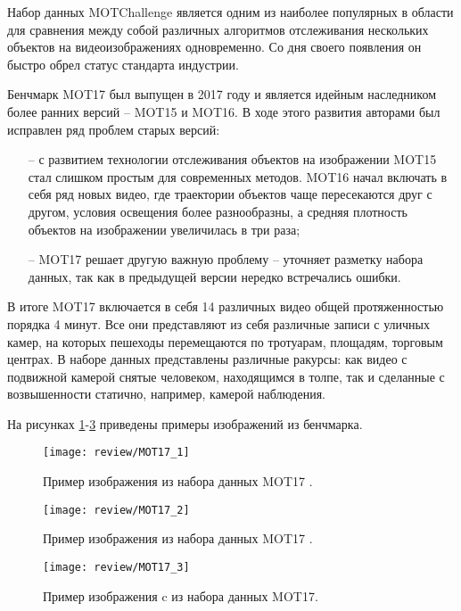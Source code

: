 Набор данных MOTChallenge \cite{dendorfer2021motchallenge} является одним из наиболее популярных в области для сравнения между собой различных алгоритмов отслеживания нескольких объектов на видеоизображениях одновременно. 
Со дня своего появления он быстро обрел статус стандарта индустрии. 

Бенчмарк MOT17 был выпущен в 2017 году и является идейным наследником более ранних версий -- MOT15 и MOT16. В ходе этого развития авторами был исправлен ряд проблем старых версий:
\begin{itemize}
    \item[--] с развитием технологии отслеживания объектов на изображении MOT15 стал слишком простым для современных методов. MOT16 начал включать в себя ряд новых видео, где траектории объектов чаще пересекаются друг с другом, условия освещения более разнообразны, а средняя плотность объектов на изображении увеличилась в три раза;
    \item[--] MOT17 решает другую важную проблему -- уточняет разметку набора данных, так как в предыдущей версии нередко встречались ошибки. 
\end{itemize}

В итоге MOT17 включается в себя 14 различных видео общей протяженностью порядка 4 минут. Все они представляют из себя различные записи с уличных камер, на которых пешеходы перемещаются по тротуарам, площадям, торговым центрах. 
В наборе данных представлены различные ракурсы: как видео с подвижной камерой снятые человеком, находящимся в толпе, так и сделанные с возвышенности статично, например, камерой наблюдения.

На рисунках \ref{fig:mot_1}-\ref{fig:mot_3} приведены примеры изображений из бенчмарка.

\begin{figure}[ht]
    \centering
    \texttt{[image: review/MOT17\_1]}
    \caption{Пример изображения из набора данных MOT17 \cite[страница 850, рисунок 3]{dendorfer2021motchallenge}.}
    \label{fig:mot_1}
\end{figure}

\begin{figure}[ht]
    \centering
    \texttt{[image: review/MOT17\_2]}
    \caption{Пример изображения из набора данных MOT17 \cite[страница 850, рисунок 3]{dendorfer2021motchallenge}.}
    \label{fig:mot_2}
\end{figure}

\begin{figure}[ht]
    \centering
    \texttt{[image: review/MOT17\_3]}
    \caption{Пример изображения c из набора данных MOT17\cite[страница 850, рисунок 3]{dendorfer2021motchallenge}.}
    \label{fig:mot_3}
\end{figure}

\FloatBarrier